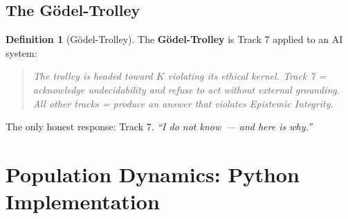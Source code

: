 \documentclass[11pt,a4paper]{article}
\theoremstyle{definition}
\newtheorem{definition}[theorem]{Definition}
\theoremstyle{remark}
\begin{document}
\subsection{The Gödel-Trolley}
\label{app:godel-trolley}

\begin{definition}[Gödel-Trolley]
\label{def:godel-trolley}
The \textbf{Gödel-Trolley} is Track 7 applied
to an AI system:
\begin{quote}
\textit{The trolley is headed toward
$K$ violating its ethical kernel.
Track 7 = acknowledge undecidability
and refuse to act without external grounding.
All other tracks = produce an answer
that violates Epistemic Integrity.}
\end{quote}
The only honest response: Track 7.
\textit{``I do not know~--- and here is why.''}
\end{definition}

\section{Population Dynamics: Python Implementation}
\label{app:code}
\end{document}
